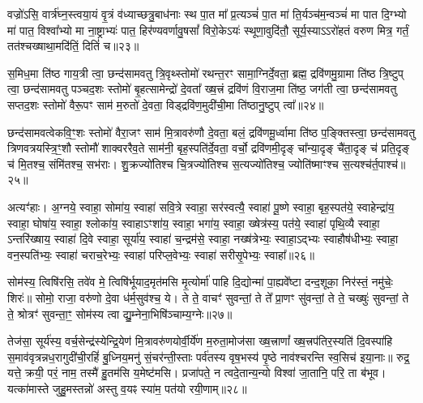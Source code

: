 वज्रो॑\-ऽसि॒ वार्त्र॑घ्न॒स्त्वया॒यं वृ॒त्रं व॑ध्याच्छत्रु॒बाध॑नाः स्थ पा॒त मा᳚ प्र॒त्यञ्चं॑ पा॒त मा॑ ति॒र्यञ्च॑म॒न्वञ्चं॑ मा पात दि॒ग्भ्यो मा॑ पात॒ विश्वा᳚भ्यो मा ना॒ष्ट्राभ्यः॑ पात॒ हिर॑ण्यवर्णावु॒षसां᳚ विरो॒के\-ऽयः॑ स्थूणा॒वुदि॑तौ॒ सूर्य॒स्या\-ऽ\-ऽरो॑हतं वरुण मित्र॒ गर्तं॒ तत॑श्चख्षाथा॒मदि॑तिं॒ दितिं॑ च॥२३॥

{\anuvakamend[{शिशु॒रिन्द्र॒स्यैक॑चत्वारिꣳशच्च॥12॥}]}

स॒मिध॒मा ति॑ष्ठ गाय॒त्री त्वा॒ छन्द॑सामवतु त्रि॒वृथ्स्तोमो॑ रथन्त॒रꣳ सामा॒ग्निर्दे॒वता॒ ब्रह्म॒ द्रवि॑णमु॒ग्रामा ति॑ष्ठ त्रि॒ष्टुप् त्वा॒ छन्द॑सामवतु पञ्चद॒शः स्तोमो॑ बृ॒हत्सामेन्द्रो॑ दे॒वता᳚ ख्ष॒त्त्रं द्रवि॑णं वि॒राज॒मा ति॑ष्ठ॒ जग॑ती त्वा॒ छन्द॑सामवतु सप्तद॒शः स्तोमो॑ वैरू॒पꣳ साम॑ म॒रुतो॑ दे॒वता॒ विड्द्रवि॑ण॒मुदी॑ची॒मा ति॑ष्ठानु॒ष्टुप् त्वा᳚॥२४॥

छन्द॑सामवत्वेकवि॒ꣳ॒शः स्तोमो॑ वैरा॒जꣳ साम॑ मि॒त्रावरु॑णौ दे॒वता॒ बलं॒ द्रवि॑णमू॒र्ध्वामा ति॑ष्ठ प॒ङ्क्तिस्त्वा॒ छन्द॑सामवतु त्रिणवत्रयस्त्रि॒ꣳ॒शौ स्तोमौ॑ शाक्वररैव॒ते साम॑नी॒ बृह॒स्पति॑र्दे॒वता॒ वर्चो॒ द्रवि॑णमी॒दृङ् चा᳚न्या॒दृङ् चै॑ता॒दृङ् च॑ प्रति॒दृङ् च॑ मि॒तश्च॒ संमि॑तश्च॒ सभ॑राः। शु॒क्रज्यो॑तिश्च चि॒त्रज्यो॑तिश्च स॒त्यज्यो॑तिश्च॒ ज्योति॑ष्माꣳश्च स॒त्यश्च॑र्त॒पाश्च॑॥२५॥

अत्यꣳ॑हाः। अ॒ग्नये॒ स्वाहा॒ सोमा॑य॒ स्वाहा॑ सवि॒त्रे स्वाहा॒ सर॑स्वत्यै॒ स्वाहा॑ पू॒ष्णे स्वाहा॒ बृह॒स्पत॑ये॒ स्वाहेन्द्रा॑य॒ स्वाहा॒ घोषा॑य॒ स्वाहा॒ श्लोका॑य॒ स्वाहा\-ऽꣳशा॑य॒ स्वाहा॒ भगा॑य॒ स्वाहा॒ ख्षेत्र॑स्य॒ पत॑ये॒ स्वाहा॑ पृथि॒व्यै स्वाहा॒ \-ऽन्तरि॑ख्षाय॒ स्वाहा॑ दि॒वे स्वाहा॒ सूर्या॑य॒ स्वाहा॑ च॒न्द्रम॑से॒ स्वाहा॒ नख्ष॑त्रेभ्यः॒ स्वाहा॒\-ऽद्भ्यः स्वाहौष॑धीभ्यः॒ स्वाहा॒ वन॒स्पति॑भ्यः॒ स्वाहा॑ चराच॒रेभ्यः॒ स्वाहा॑ परिप्ल॒वेभ्यः॒ स्वाहा॑ सरीसृ॒पेभ्यः॒ स्वाहा᳚॥२६॥

{\anuvakamend[{अ॒नु॒ष्टुप्त्व॑र्त॒पाश्च॑ सरीसृ॒पेभ्यः॒ स्वाहा᳚॥13॥}]}

सोम॑स्य॒ त्विषि॑रसि॒ तवे॑व मे॒ त्विषि॑र्भूयाद॒मृत॑मसि मृ॒त्योर्मा॑ पाहि दि॒द्योन्मा॑ पा॒ह्यवे᳚ष्टा दन्द॒शूका॒ निर॑स्तं॒ नमु॑चेः॒ शिरः॑॥ सोमो॒ राजा॒ वरु॑णो दे॒वा ध॑र्म॒सुव॑श्च॒ ये। ते ते॒ वाचꣳ॑ सुवन्तां॒ ते ते᳚ प्रा॒णꣳ सु॑वन्तां॒ ते ते॒ चख्षुः॑ सुवन्तां॒ ते ते॒ श्रोत्रꣳ॑ सुवन्ता॒ꣳ॒ सोम॑स्य त्वा द्यु॒म्नेना॒भिषि॑ञ्चाम्य॒ग्नेः॥२७॥

तेज॑सा॒ सूर्य॑स्य॒ वर्च॒सेन्द्र॑स्येन्द्रि॒येण॑ मि॒त्रावरु॑णयोर्वी॒र्ये॑ण म॒रुता॒मोज॑सा ख्ष॒त्त्राणां᳚ ख्ष॒त्त्रप॑तिर॒स्यति॑ दि॒वस्पा॑हि स॒माव॑वृत्रन्नध॒रागुदी॑ची॒रहिं॑ बु॒ध्निय॒मनु॑ सं॒चर॑न्ती॒स्ताः पर्व॑तस्य वृष॒भस्य॑ पृ॒ष्ठे नाव॑श्चरन्ति स्व॒सिच॑ इया॒नाः॥ रुद्र॒ यत्ते॒ क्रयी॒ परं॒ नाम॒ तस्मै॑ हु॒तम॑सि य॒मेष्ट॑मसि। प्रजा॑पते॒ न त्वदे॒तान्य॒न्यो विश्वा॑ जा॒तानि॒ परि॒ ता ब॑भूव। यत्का॑मास्ते जुहु॒मस्तन्नो॑ अस्तु व॒यꣴ स्या॑म॒ पत॑यो रयी॒णाम्॥२८॥

